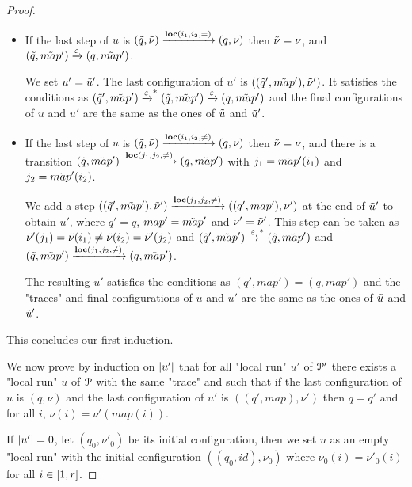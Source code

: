 \begin{proof}
\begin{itemize}
		\item 
		If the last step of $u$ is $(\Tilde{q}, \Tilde{\nu}) \xrightarrow{\textbf{loc}(i_1,i_2,{=})} (q, \nu)$ then $\Tilde{\nu} = \nu$, and $(\Tilde{q}, \Tilde{map}') \xrightarrow{\varepsilon} (q, \Tilde{map}')$.
		
		We set $u' = \Tilde{u}'$. The last configuration of $u'$ is $((\Tilde{q}', \Tilde{map}'), \Tilde{\nu}')$. It satisfies the conditions as $(\Tilde{q}', \Tilde{map}') \xrightarrow{\varepsilon}^* (\Tilde{q}, \Tilde{map}') \xrightarrow{\varepsilon} (q, \Tilde{map}')$ and the final configurations of $u$ and $u'$ are the same as the ones of $\Tilde{u}$ and $\Tilde{u}'$.
		
		\item 
		If the last step of $u$ is $(\Tilde{q}, \Tilde{\nu}) \xrightarrow{\textbf{loc}(i_1,i_2,{\ne})} (q, \nu)$ then $\Tilde{\nu} = \nu$, and there is a transition $(\Tilde{q}, \Tilde{map}') \xrightarrow{\textbf{loc}(j_1,j_2,{\ne})} (q, \Tilde{map}')$ with $j_1=\Tilde{map}'(i_1)$ and $j_2=\Tilde{map}'(i_2)$.
		
		We add a step $((\Tilde{q}', \Tilde{map}'), \Tilde{\nu}') \xrightarrow{\textbf{loc}(j_1,j_2,{\ne})} ((q', map'), \nu')$ at the end of $\Tilde{u}'$ to obtain $u'$, where $q' = q$, $map' = \Tilde{map}'$ and $\nu' = \Tilde{\nu}'$. 
		This step can be taken as $\Tilde{\nu}'(j_1) = \Tilde{\nu}(i_1) \neq \Tilde{\nu}(i_2) = \Tilde{\nu}'(j_2)$ and $(\Tilde{q}', \Tilde{map}') \xrightarrow{\varepsilon}^* (\Tilde{q}, \Tilde{map}')$ and $(\Tilde{q}, \Tilde{map}') \xrightarrow{\textbf{loc}(j_1,j_2,{\ne})} (q, \Tilde{map}')$.   
		
		The resulting $u'$ satisfies the conditions as $(q', map') = (q, map')$ and the "traces" and final configurations of $u$ and $u'$ are the same as the ones of $\Tilde{u}$ and $\Tilde{u}'$.
	\end{itemize}
	
	This concludes our first induction.
	
	We now prove by induction on $|u'|$ that for all "local run" $u'$ of $\mathcal{P}'$ there exists a "local run" $u$ of $\mathcal{P}$ with the same "trace" and such that if the last configuration of $u$ is $(q,\nu)$ and the last configuration of $u'$ is $((q',map), \nu')$ then $q=q'$ and for all $i$, $\nu(i) = \nu'(map(i))$.  
	
	If $|u'| = 0$, let $(q_0, \nu'_0)$ be its initial configuration, then we  set $u$ as an empty "local run" with the initial configuration $((q_0, id), \nu_0)$ where $\nu_0(i) = \nu'_0(i)$ for all $i \in [1,r]$.
	

\end{proof}
